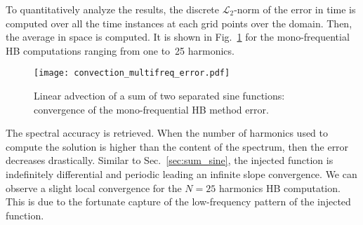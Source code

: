 To quantitatively analyze the results,
the discrete $\mathcal{L}_2$-norm of the error 
in time is computed over all the time instances
at each grid points over the domain.
Then, the average in space is computed.
It is shown in Fig.~\ref{fig:conv_multifreq_tsm} for the
mono-frequential HB computations ranging from one to~25
harmonics.
\begin{figure}[htb]
  \centering
  \texttt{[image: convection\_multifreq\_error.pdf]}
  \caption{Linear advection of a sum of two separated sine functions: convergence of the mono-frequential HB method error.}
  \label{fig:conv_multifreq_tsm}
\end{figure}
The spectral accuracy is retrieved. When the number of harmonics
used to compute the solution is higher than the content of the spectrum,
then the error decreases drastically. Similar to Sec.~\ref{sec:sum_sine},
the injected function is indefinitely differential and periodic
leading an infinite slope convergence. We can observe a slight local convergence
for the $N=25$ harmonics HB computation. This is due to the fortunate 
capture of the low-frequency pattern of the injected function.






